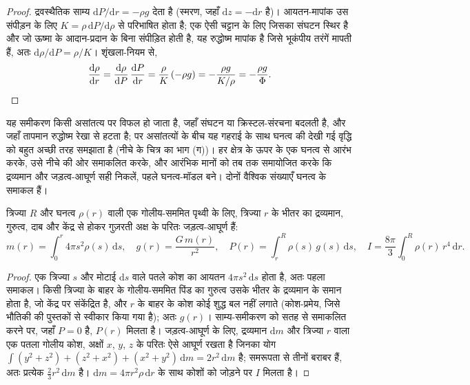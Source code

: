 \begin{proof}
द्रवस्थैतिक साम्य $\mathrm dP/\mathrm dr = -\rho g$ देता है (स्मरण, जहाँ $\mathrm dz = -\mathrm dr$ है)। आयतन-मापांक उस संपीड़न के लिए $K = \rho\,\mathrm dP/\mathrm d\rho$ से परिभाषित होता है; एक ऐसी चट्टान के लिए जिसका संघटन स्थिर है और जो ऊष्मा के आदान-प्रदान के बिना संपीड़ित होती है, यह रुद्धोष्म मापांक है जिसे भूकंपीय तरंगें मापती हैं, अतः $\mathrm d\rho/\mathrm dP = \rho/K$। शृंखला-नियम से,
\[
  \frac{\mathrm d\rho}{\mathrm dr} = \frac{\mathrm d\rho}{\mathrm dP}\,
  \frac{\mathrm dP}{\mathrm dr} = \frac{\rho}{K}\,(-\rho g) = -\frac{\rho g}{K/\rho}
  = -\frac{\rho g}{\Phi}. \qedhere
\]
\end{proof}

यह समीकरण किसी असांतत्य पर विफल हो जाता है, जहाँ संघटन या क्रिस्टल-संरचना बदलती है, और जहाँ तापमान रुद्धोष्म रेखा से हटता है; पर असांतत्यों के बीच यह गहराई के साथ घनत्व की देखी गई वृद्धि को बहुत अच्छी तरह समझाता है (नीचे के चित्र का भाग (ग))। हर क्षेत्र के ऊपर के एक घनत्व से आरंभ करके, उसे नीचे की ओर समाकलित करके, और आरंभिक मानों को तब तक समायोजित करके कि द्रव्यमान और जड़त्व-आघूर्ण सही निकलें, पहले घनत्व-मॉडल बने। दोनों वैश्विक संख्याएँ घनत्व के समाकल हैं।

\begin{proposition}[द्रव्यमान, गुरुत्व, दाब और जड़त्व-आघूर्ण]
\label{prop:b1:layered-earth:integrals}
त्रिज्या $R$ और घनत्व $\rho(r)$ वाली एक गोलीय-सममित पृथ्वी के लिए, त्रिज्या $r$ के भीतर का द्रव्यमान, गुरुत्व, दाब और केंद्र से होकर गुज़रती अक्ष के परितः जड़त्व-आघूर्ण हैं:
\[
  m(r) = \int_0^r 4\pi s^2\rho(s)\,\mathrm ds, \quad
  g(r) = \frac{G\,m(r)}{r^2}, \quad
  P(r) = \int_r^R \rho(s)\,g(s)\,\mathrm ds, \quad
  I = \frac{8\pi}{3}\int_0^R \rho(r)\,r^4\,\mathrm dr.
\]
\end{proposition}

\begin{proof}
एक त्रिज्या $s$ और मोटाई $\mathrm ds$ वाले पतले कोश का आयतन $4\pi s^2\,\mathrm ds$ होता है, अतः पहला समाकल। किसी त्रिज्या के बाहर के गोलीय-सममित पिंड का गुरुत्व उसके भीतर के द्रव्यमान के समान होता है, जो केंद्र पर संकेंद्रित है, और $r$ के बाहर के कोश कोई शुद्ध बल नहीं लगाते (कोश-प्रमेय, जिसे भौतिकी की पुस्तकों से स्वीकार किया गया है); अतः $g(r)$। साम्य-समीकरण को सतह से समाकलित करने पर, जहाँ $P = 0$ है, $P(r)$ मिलता है। जड़त्व-आघूर्ण के लिए, द्रव्यमान $\mathrm dm$ और त्रिज्या $r$ वाला एक पतला गोलीय कोश, अक्षों $x$, $y$, $z$ के परितः ऐसे आघूर्ण रखता है जिनका योग $\int (y^2 + z^2) + (z^2 + x^2) + (x^2 + y^2)\,\mathrm dm = 2r^2\,\mathrm dm$ है; समरूपता से तीनों बराबर हैं, अतः प्रत्येक $\tfrac23 r^2\,\mathrm dm$ है। $\mathrm dm = 4\pi r^2\rho\,\mathrm dr$ के साथ कोशों को जोड़ने पर $I$ मिलता है।
\end{proof}

